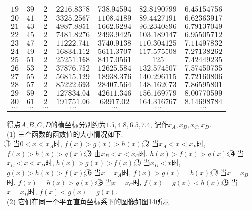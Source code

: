 \documentclass[10pt,a4paper]{article}
\begin{document}
\begin{enumerate}[1.]
\begin{center}
\begin{longtable}{|c|c|c|c|c|c|c|}
        $19$ & $39$ & $2$ & $2216.8378$ & $738.94594$ & $82.8190799$ & $6.45154756$\\ \hline
        $20$ & $41$ & $2$ & $3325.2567$ & $1108.4189$ & $89.4427191$ & $6.62363917$\\ \hline
        $21$ & $43$ & $2$ & $4987.8851$ & $1662.6284$ & $96.2340896$ & $6.79137049$\\ \hline
        $22$ & $45$ & $2$ & $7481.8276$ & $2493.9425$ & $103.189147$ & $6.95505712$\\ \hline
        $23$ & $47$ & $2$ & $11222.741$ & $3740.9138$ & $110.304125$ & $7.11497832$\\ \hline
        $24$ & $49$ & $2$ & $16834.112$ & $5611.3707$ & $117.575508$ & $7.27138262$\\ \hline
        $25$ & $51$ & $2$ & $25251.168$ & $8417.0561$ & $125$ & $7.42449235$\\ \hline
        $26$ & $53$ & $2$ & $37876.752$ & $12625.584$ & $132.574507$ & $7.57450735$\\ \hline
        $27$ & $55$ & $2$ & $56815.129$ & $18938.376$ & $140.296115$ & $7.72160806$\\ \hline
        $28$ & $57$ & $2$ & $85222.693$ & $28407.564$ & $148.162073$ & $7.86595801$\\ \hline
        $29$ & $59$ & $2$ & $127834.04$ & $42611.346$ & $156.169779$ & $8.00770599$\\ \hline
        $30$ & $61$ & $2$ & $191751.06$ & $63917.02$ & $164.316767$ & $8.14698784$\\ \hline
        $\cdots$ & $\cdots$ & $\cdots$ & $\cdots$ & $\cdots$ & $\cdots$ & $\cdots$ \\ \hline
    \end{longtable}
\end{center}
得点$A,B,C,D$的横坐标分别约为$1.5,4.8, 6.5, 7.4$, 记作$x_A,x_B,x_C,x_D$.\\
(1) 三个函数的函数值的大小情况如下:\\
\textcircled{1} 当$0<x<x_A$时, $f(x)>g(x)>h(x)$;
\textcircled{2} 当$x_A<x<x_B$时, $f(x)>h(x)>g(x)$;
\textcircled{3} 由$x_B<x<x_C$时, $h(x)>f(x)>g(x)$;
\textcircled{4} 当$x_C<x<x_D$时, $h(x)>g(x)>f(x)$;
\textcircled{5} 当$x_D<x$时, $g(x)>h(x)>f(x)$;
\textcircled{6} 当$x=x_A$时, $f(x)>g(x)=h(x)$;
\textcircled{7} 当$x=x_B$时, $f(x)=h(x)>g(x)$;
\textcircled{8} 当$x=x_C$时, $f(x)=g(x)<h(x)$;
\textcircled{9} 当$x=x_D$时, $f(x)<g(x)=g(x)$.\\
(2) 它们在同一个平面直角坐标系下的图像如图14所示.
\begin{center}

\end{center}
\end{enumerate}
\end{document}
